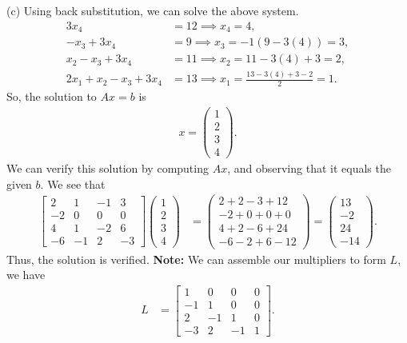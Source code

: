\documentclass{report}
\begin{document}
    (c) Using back substitution, we can solve the above system.
    \begin{align*}
        3x_{4} &= 12 \implies x_{4} = 4, \\
        -x_{3} + 3x_{4} &= 9 \implies x_{3} = -1(9-3(4)) = 3, \\
        x_{2} - x_{3} + 3x_{4} &= 11 \implies x_{2} = 11 - 3(4)+3 = 2, \\
        2x_{1} + x_{2} - x_{3} + 3x_{4} &= 13 \implies x_{1} = \frac{13-3(4)+3-2}{2} = 1
    .\end{align*}
    So, the solution to $Ax = b$ is 
    \begin{align*}
        x = \begin{pmatrix} 1 \\ 2 \\ 3 \\ 4 \end{pmatrix}
    .\end{align*}
    We can verify this solution by computing $Ax$, and observing that it equals the given $b$. We see that
    \begin{align*}
        \begin{bmatrix}
            2 & 1 & -1 & 3  \\
            -2 & 0 & 0 & 0  \\
            4 & 1 & -2 & 6 \\
            -6 & -1 & 2 & -3
        \end{bmatrix}
        \begin{pmatrix} 1 \\ 2\\ 3\\ 4 \end{pmatrix}
        &= 
        \begin{pmatrix} 2 + 2 -3 + 12 \\ -2 +  0 + 0 + 0 \\ 4 + 2 - 6 + 24 \\ -6 -2 + 6 -12 \end{pmatrix} = 
        \begin{pmatrix} 13 \\ -2 \\ 24 \\ -14 \end{pmatrix}
    .\end{align*}
    Thus, the solution is verified.
    \bigbreak \noindent 
    \textbf{Note:} We can assemble our multipliers to form $L$, we have
    \begin{align*}
        L &= \begin{bmatrix}
            1 & 0& 0 & 0 \\
            -1 & 1 & 0& 0 \\
            2 & -1 & 1 & 0\\
            -3 & 2 & -1 & 1
        \end{bmatrix}
    .\end{align*}
\end{document}
